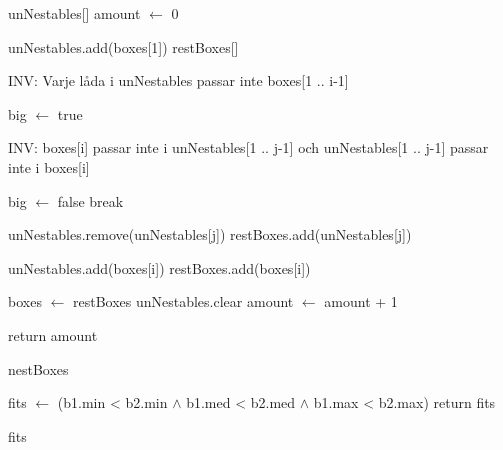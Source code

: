 \documentclass[a4paper]{article}
\begin{document}
\begin{algorithm}[H]
\SetAlgoLined
{}
	unNestables[] \newline
	amount $\leftarrow$ 0\newline
	
	 {
		unNestables.add(boxes[1])\newline
		restBoxes[]\newline
		 {
			INV: Varje låda i unNestables passar inte boxes[1 .. i-1]\newline
			
			big $\leftarrow$ true\newline
			 {
				INV: boxes[i] passar inte i unNestables[1 .. j-1] och unNestables[1 .. j-1] passar inte i boxes[i] \newline
				
				 {
					 {
						big $\leftarrow$ false\newline
						break\newline
						
					}  {
						unNestables.remove(unNestables[j])\newline
						restBoxes.add(unNestables[j])
					}
			}
		}
		
		 {
			unNestables.add(boxes[i])
		} {
			restBoxes.add(boxes[i])
		}
	}
	
	boxes $\leftarrow$ restBoxes\newline
	unNestables.clear\newline
	amount $\leftarrow$ amount + 1
}

return amount

\caption{nestBoxes}
\end{algorithm}

\begin{algorithm}[H]
\SetAlgoLined
{}
	fits $\leftarrow$ (b1.min < b2.min $\wedge$ b1.med < b2.med $\wedge$ b1.max < b2.max)\newline
	return fits


\caption{fits}
\end{algorithm}
\end{document}
